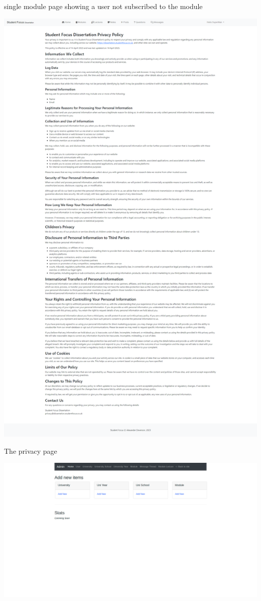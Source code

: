 single module page showing a user not subscribed to the module

\includegraphics[scale=0.20]{images/application/47 - privacy.png}

The privacy page

\includegraphics[scale=0.20]{images/application/48 - admin_home.png}

